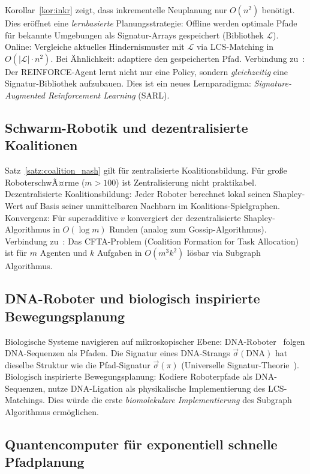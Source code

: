 ﻿\documentclass[a4paper,12pt]{article}
\theoremstyle{definition}
\begin{document}
Korollar~\ref{kor:inkr} zeigt, dass inkrementelle Neuplanung nur $O(n^2)$
ben\"otigt. Dies er\"offnet eine \emph{lernbasierte} Planungsstrategie:
Offline werden optimale Pfade f\"ur bekannte Umgebungen als Signatur-Arrays
gespeichert (Bibliothek $\mathcal{L}$).
Online: Vergleiche aktuelles Hindernismuster mit $\mathcal{L}$ via
LCS-Matching in $O(|\mathcal{L}| \cdot n^2)$.
Bei \"Ahnlichkeit: adaptiere den gespeicherten Pfad.
Verbindung zu~\cite{epp2026hetnet,epp2026robosim}:
Der REINFORCE-Agent lernt nicht nur eine Policy, sondern \emph{gleichzeitig}
eine Signatur-Bibliothek aufzubauen. Dies ist ein neues Lernparadigma:
\emph{Signature-Augmented Reinforcement Learning} (SARL).

\subsection{Schwarm-Robotik und dezentralisierte Koalitionen}

Satz~\ref{satz:coalition_nash} gilt f\"ur zentralisierte Koalitionsbildung.
F\"ur gro{\ss}e RoboterschwÃ¤rme ($m > 100$) ist Zentralisierung nicht
praktikabel.
Dezentralisierte Koalitionsbildung: Jeder Roboter berechnet lokal seinen
Shapley-Wert auf Basis seiner unmittelbaren Nachbarn im Koalitions-Spielgraphen.
Konvergenz: F\"ur superadditive $v$ konvergiert der dezentralisierte
Shapley-Algorithmus in $O(\log m)$ Runden (analog zum Gossip-Algorithmus).
Verbindung zu~\cite{epp2026ecfta}: Das CFTA-Problem (Coalition Formation
for Task Allocation) ist f\"ur $m$ Agenten und $k$ Aufgaben in
$O(m^3 k^2)$ l\"osbar via Subgraph Algorithmus.

\subsection{DNA-Roboter und biologisch inspirierte Bewegungsplanung}

Biologische Systeme navigieren auf mikroskopischer Ebene: DNA-Roboter~\cite{epp2026dna}
folgen DNA-Sequenzen als Pfaden.
Die Signatur eines DNA-Strangs $\vec{\sigma}(\text{DNA})$ hat dieselbe
Struktur wie die Pfad-Signatur $\vec{\sigma}(\pi)$
(Universelle Signatur-Theorie~\cite{epp2026ust}).
Biologisch inspirierte Bewegungsplanung: Kodiere Roboterpfade als
DNA-Sequenzen, nutze DNA-Ligation als physikalische Implementierung des
LCS-Matchings.
Dies w\"urde die erste \emph{biomolekulare Implementierung} des
Subgraph Algorithmus erm\"oglichen.

\subsection{Quantencomputer f\"ur exponentiell schnelle Pfadplanung}
\end{document}
